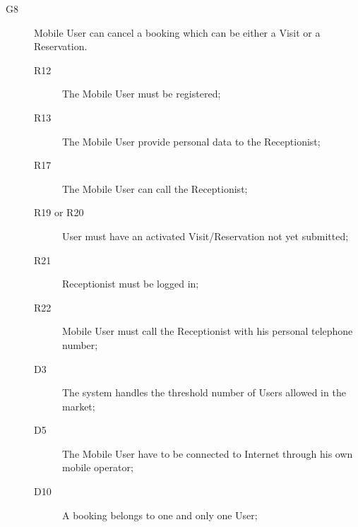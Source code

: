 \begin{description}
    \item[G8]Mobile User can cancel a booking which can be either a Visit or a Reservation.
    \begin{description}
    \item[R12] The Mobile User must be registered; %
    \item[R13] The Mobile User provide personal data to the Receptionist; %
    \item[R17] The Mobile User can call the Receptionist;  
    \item[R19 or R20] User must have an activated Visit/Reservation not yet submitted;
    \item[R21] Receptionist must be logged in;
    \item[R22] Mobile User must call the Receptionist with his personal telephone number;
    \item[D3] The system handles the threshold number of Users allowed in the market;
    \item[D5] The Mobile User have to be connected to Internet through his own mobile operator;
    \item[D10] A booking belongs to one and only one User;
    \end{description}
    
    
\end{description}

\pagebreak

